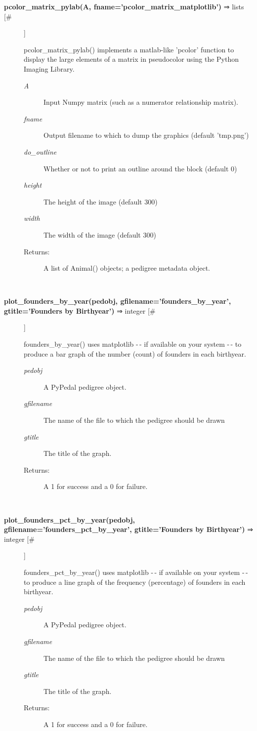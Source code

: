 \begin{description}
\item[\textbf{pcolor\_matrix\_pylab(A, fname='pcolor\_matrix\_matplotlib')} ⇒ lists [\#]
]
\par pcolor\_matrix\_pylab() implements a matlab-like 'pcolor' function to
display the large elements of a matrix in pseudocolor using the Python Imaging
Library.
\begin{description}
\item[\textit{A}
]
Input Numpy matrix (such as a numerator relationship matrix).
\item[\textit{fname}
]
Output filename to which to dump the graphics (default 'tmp.png')
\item[\textit{do\_outline}
]
Whether or not to print an outline around the block (default 0)
\item[\textit{height}
]
The height of the image (default 300)
\item[\textit{width}
]
The width of the image (default 300)
\item[Returns:
]
A list of Animal() objects; a pedigree metadata object.
\end{description}\\

\item[\textbf{plot\_founders\_by\_year(pedobj, gfilename='founders\_by\_year', gtitle='Founders by Birthyear')} ⇒ integer [\#]
]
\par founders\_by\_year() uses matplotlib -$\,$- if available on your system -$\,$- to produce a
bar graph of the number (count) of founders in each birthyear.
\begin{description}
\item[\textit{pedobj}
]
A PyPedal pedigree object.
\item[\textit{gfilename}
]
The name of the file to which the pedigree should be drawn
\item[\textit{gtitle}
]
The title of the graph.
\item[Returns:
]
A 1 for success and a 0 for failure.
\end{description}\\

\item[\textbf{plot\_founders\_pct\_by\_year(pedobj, gfilename='founders\_pct\_by\_year', gtitle='Founders by Birthyear')} ⇒ integer [\#]
]
\par founders\_pct\_by\_year() uses matplotlib -$\,$- if available on your system -$\,$- to produce a
line graph of the frequency (percentage) of founders in each birthyear.
\begin{description}
\item[\textit{pedobj}
]
A PyPedal pedigree object.
\item[\textit{gfilename}
]
The name of the file to which the pedigree should be drawn
\item[\textit{gtitle}
]
The title of the graph.
\item[Returns:
]
A 1 for success and a 0 for failure.
\end{description}\\


\end{description}
